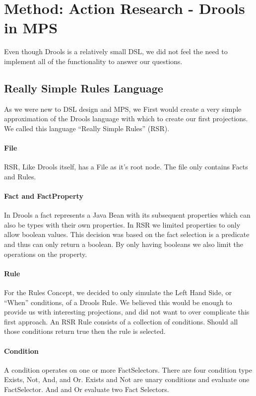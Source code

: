 \section{Method: Action Research - Drools in MPS}\label{section:Method_action_research}

Even though Drools is a relatively small DSL, we did not feel the need to implement all of the functionality to answer our questions.

\subsection{Really Simple Rules Language}
As we were new to DSL design and MPS, we First would create a very simple approximation of the Drools language with which to create our first projections.
We called this language ``Really Simple Rules'' (RSR).

\paragraph{File} RSR, Like Drools itself, has a File as it's root node.
The file only contains Facts and Rules.

\paragraph{Fact and FactProperty} In Drools a fact represents a Java Bean with its subsequent properties which can also be types with their own properties.
In RSR we limited properties to only allow boolean values.
This decision was based on the fact selection is a predicate and thus can only return a boolean.
By only having booleans we also limit the operations on the property.

\paragraph{Rule} For the Rules Concept, we decided to only simulate the Left Hand Side, or ``When'' conditions, of a Drools Rule.
We believed this would be enough to provide us with interesting projections, and did not want to over complicate this first approach.
An RSR Rule consists of a collection of conditions.
Should all those conditions return true then the rule is selected.

\paragraph{Condition} A condition operates on one or more FactSelectors.
There are four condition type Exists, Not, And, and Or.
Exists and Not are unary conditions and evaluate one FactSelector.
And and Or evaluate two Fact Selectors.

